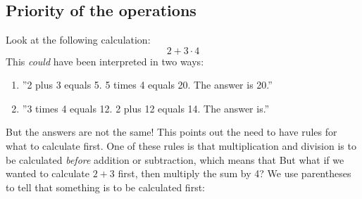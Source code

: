 




\section{\rrek}
\subsection*{Priority of the operations}
Look at the following calculation:
\[ 2+3\cdot4 \]
This \textsl{could} have been interpreted in two ways:
\begin{enumerate}
	\item ''2 plus 3 equals 5. 5 times 4 equals 20. The answer is 20.''
	\item ''3 times 4 equals 12. 2 plus 12 equals 14. The answer is.''
\end{enumerate}
But the answers are not the same! This points out the need to have rules for what to calculate first. One of these rules is that multiplication and division is to be calculated \textsl{before} addition or subtraction, which means that \regv
\st{ \vs
{}
}
But what if we wanted to calculate $ 2+3 $ first, then multiply the sum by 4? We use parentheses to tell that something is to be calculated first: \regv
\st{\vs
{}
}\regv

\newpage
{}
